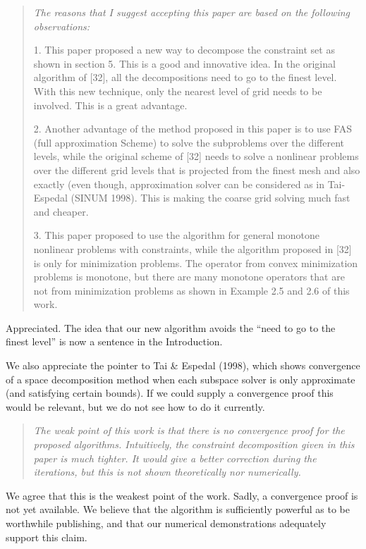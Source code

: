 \documentclass[letterpaper,final,12pt,reqno]{amsart}
\newenvironment{review}%
{\bigskip \par \begin{quote} \selectfont \sl}%
{\end{quote}}
\newenvironment{response}%
{\medskip\noindent}%
{}
\begin{document}
\begin{review}
The reasons that I suggest accepting this paper are based on the following observations:

1. This paper proposed a new way to decompose the constraint set as shown in section 5. This is a good and innovative idea. In the original algorithm of [32], all the decompositions need to go to the finest level. With this new technique, only the nearest level of grid needs to be involved. This is a great advantage.

2. Another advantage of the method proposed in this paper is to use FAS (full approximation Scheme) to solve the subproblems over the different levels, while the original scheme of [32] needs to solve a nonlinear problems over the different grid levels that is projected from the finest mesh and also exactly (even though, approximation solver can be considered as in Tai-Espedal (SINUM 1998). This is making the coarse grid solving much fast and cheaper.

3. This paper proposed to use the algorithm for general monotone nonlinear problems with constraints, while the algorithm proposed in [32] is only for minimization problems. The operator from convex minimization problems is monotone, but there are many monotone operators that are not from minimization problems as shown in Example 2.5 and 2.6 of this work.
\end{review}

\begin{response}
Appreciated.  The idea that our new algorithm avoids the ``need to go to the finest level''  is now a sentence in the Introduction.

We also appreciate the pointer to Tai \& Espedal (1998), which shows convergence of a space decomposition method when each subspace solver is only approximate (and satisfying certain bounds).  If we could supply a convergence proof this would be relevant, but we do not see how to do it currently.
\end{response}

\begin{review}
The weak point of this work is that there is no convergence proof for the proposed algorithms. Intuitively, the constraint decomposition given in this paper is much tighter. It would give a better correction during the iterations, but this is not shown theoretically nor numerically.
\end{review}

\begin{response}
We agree that this is the weakest point of the work.  Sadly, a convergence proof is not yet available.  We believe that the algorithm is sufficiently powerful as to be worthwhile publishing, and that our numerical demonstrations adequately support this claim.
\end{response}
\end{document}
